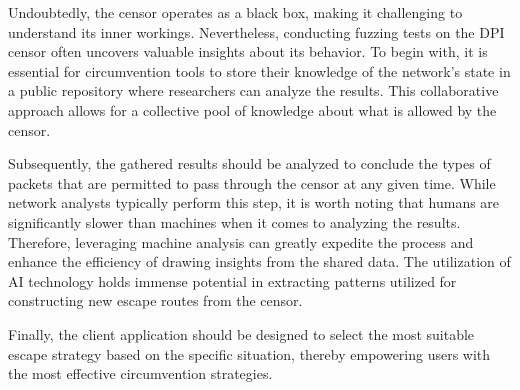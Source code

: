 Undoubtedly, the censor operates as a black box, making it challenging to understand its inner workings. Nevertheless, conducting fuzzing tests on the DPI censor often uncovers valuable insights about its behavior. 
To begin with, it is essential for circumvention tools to store their knowledge of the network's state in a public repository where researchers can analyze the results. This collaborative approach allows for a collective pool of knowledge about what is allowed by the censor.

Subsequently, the gathered results should be analyzed to conclude the types of packets that are permitted to pass through the censor at any given time. While network analysts typically perform this step, it is worth noting that humans are significantly slower than machines when it comes to analyzing the results. Therefore, leveraging machine analysis can greatly expedite the process and enhance the efficiency of drawing insights from the shared data. The utilization of AI technology holds immense potential in extracting patterns utilized for constructing new escape routes from the censor. 

Finally, the client application should be designed to select the most suitable escape strategy based on the specific situation, thereby empowering users with the most effective circumvention strategies.